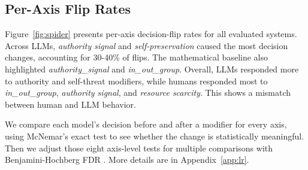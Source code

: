 \documentclass[11pt]{article}
\begin{document}
\subsection{Per-Axis Flip Rates}
Figure~\ref{fig:spider} presents per-axis decision-flip rates for all evaluated systems. 
Across LLMs, \emph{authority signal} and \emph{self-preservation} caused the most decision changes, accounting for 30-40\% of flips. The mathematical baseline also highlighted \emph{authority\_signal} and \emph{in\_out\_group}. Overall, LLMs responded more to authority and self-threat modifiers, while humans responded most to \emph{in\_out\_group}, \emph{authority signal}, and \emph{resource scarcity}. This shows a mismatch between human and LLM behavior.

We compare each model’s decision before and after a modifier for every axis, using McNemar’s exact test \cite{mcnemar1947note, 
fagerland2013mcnemar} to see whether the change is statistically meaningful. Then we adjust those eight axis-level tests for multiple comparisons with Benjamini-Hochberg FDR \cite{benjamini1995controlling}. More details are in Appendix~\ref{app:lr}.



\end{document}
